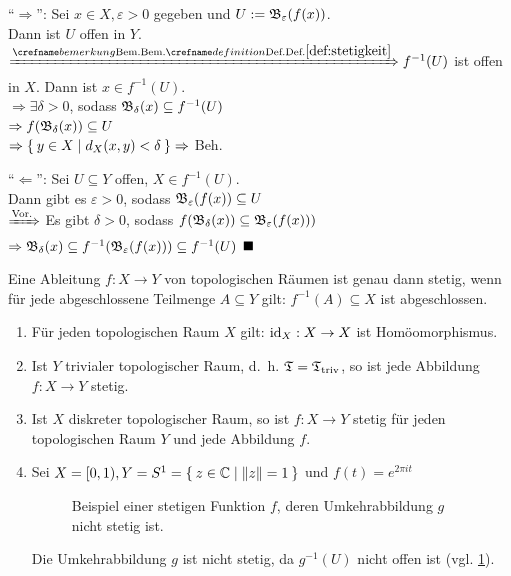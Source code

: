 \begin{beweis}
    \enquote{$\Rightarrow$}: Sei $x \in X, \varepsilon > 0$ gegeben
    und $U := \mathfrak{B}_\varepsilon(f(x))$.\\
    Dann ist $U$ offen in $Y$.\\
    $\xRightarrow{\crefabbr{def:stetigkeit}} f^{-1}(U)$  ist 
    offen in $X$. Dann ist $x \in f^{-1}(U)$.\\
    $\Rightarrow \exists \delta > 0$, sodass 
    $\mathfrak{B}_\delta(x) \subseteq f^{-1} (U)$\\
    $\Rightarrow f(\mathfrak{B}_\delta(x)) \subseteq U$\\
    $\Rightarrow \Set{y \in X | d_X(x,y) < \delta} \Rightarrow$ Beh.

    \enquote{$\Leftarrow$}: Sei $U \subseteq Y$ offen, $X \in f^{-1}(U)$.\\
    Dann gibt es $\varepsilon > 0$, sodass $\mathfrak{B}_\varepsilon(f(x)) \subseteq U$\\
    $\xRightarrow{\text{Vor.}}$ Es gibt $\delta > 0$, sodass
    $f(\mathfrak{B}_\delta(x)) \subseteq \mathfrak{B}_\varepsilon (f(x)))$\\
    $\Rightarrow \mathfrak{B}_\delta(x) \subseteq f^{-1}(\mathfrak{B}_\varepsilon(f(x))) \subseteq f^{-1}(U)$
    $\qed$
\end{beweis}

\begin{bemerkung}
    Eine Ableitung $f: X \rightarrow Y$ von topologischen Räumen ist
    genau dann stetig, wenn für jede abgeschlossene Teilmenge $A \subseteq Y$
    gilt: $f^{-1}(A) \subseteq X$ ist abgeschlossen.
\end{bemerkung}

\begin{beispiel}
    \begin{enumerate}[label=\arabic*)]
        \item Für jeden topologischen Raum $X$ gilt: $\textnormal{id}_X : X \rightarrow X$
              ist Homöomorphismus.
        \item Ist $Y$ trivialer topologischer Raum, d.~h. $\mathfrak{T} = \mathfrak{T}_\text{triv}$,
              so ist jede Abbildung $f:X \rightarrow Y$ stetig.
        \item Ist $X$ diskreter topologischer Raum, so ist $f:X \rightarrow Y$
              stetig für jeden topologischen Raum $Y$ und jede Abbildung $f$.
        \item Sei $X = [0, 1), Y = S^1 = \Set{z \in \ensuremath{\mathbb{C}}| \|z\| = 1}$
              und $f(t) = e^{2 \pi i t}$
              \begin{figure}[htp]
                \centering
                
                \caption{Beispiel einer stetigen Funktion $f$, deren 
                         Umkehrabbildung $g$ nicht stetig ist.}
                \label{fig:nicht-stetige-umkehrabbildung}
              \end{figure}
              Die Umkehrabbildung $g$ ist nicht stetig, da $g^{-1}(U)$
              nicht offen ist (vgl. \cref{fig:nicht-stetige-umkehrabbildung}).
    \end{enumerate}
\end{beispiel}

